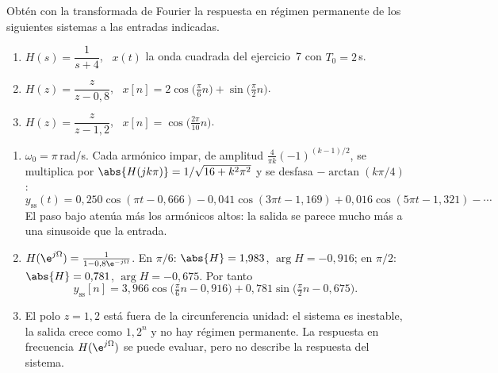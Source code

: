 \documentclass[11pt,a4paper]{scrartcl}
\begin{document}
\begin{ejercicio}
  Obtén con la transformada de Fourier la respuesta en régimen permanente de los siguientes sistemas a las entradas indicadas.
  \begin{enumerate}[label=\alph*)]
    \item $H(s)=\dfrac{1}{s+4}$, \ $x(t)$ la onda cuadrada del ejercicio~7 con $T_0=2$\,s.
    \item $H(z)=\dfrac{z}{z-0{,}8}$, \ $x[n]=2\cos\big(\tfrac\pi6n\big)+\sin\big(\tfrac\pi2n\big)$.
    \item $H(z)=\dfrac{z}{z-1{,}2}$, \ $x[n]=\cos\big(\tfrac{2\pi}{10}n\big)$.
  \end{enumerate}
\end{ejercicio}
\begin{solucion}
  \begin{enumerate}[label=\alph*)]
    \item $\omega_0=\pi$\,rad/s. Cada armónico impar, de amplitud $\frac{4}{\pi k}(-1)^{(k-1)/2}$, se multiplica por $\abs{H(jk\pi)}=1/\sqrt{16+k^2\pi^2}$ y se desfasa $-\arctan(k\pi/4)$:
    \[
      y_{\mathrm{ss}}(t)=0{,}250\cos(\pi t-0{,}666)-0{,}041\cos(3\pi t-1{,}169)+0{,}016\cos(5\pi t-1{,}321)-\cdots
    \]
    El paso bajo atenúa más los armónicos altos: la salida se parece mucho más a una sinusoide que la entrada.
    \item $H(\e^{j\Omega})=\frac{1}{1-0{,}8\e^{-j\Omega}}$. En $\pi/6$: $\abs{H}=1{,}983$, $\arg H=-0{,}916$; en $\pi/2$: $\abs{H}=0{,}781$, $\arg H=-0{,}675$. Por tanto
    \[
      y_{\mathrm{ss}}[n]=3{,}966\cos\big(\tfrac\pi6n-0{,}916\big)+0{,}781\sin\big(\tfrac\pi2n-0{,}675\big).
    \]
    \item El polo $z=1{,}2$ está fuera de la circunferencia unidad: el sistema es inestable, la salida crece como $1{,}2^n$ y no hay régimen permanente. La respuesta en frecuencia $H(\e^{j\Omega})$ se puede evaluar, pero no describe la respuesta del sistema.
  \end{enumerate}
\end{solucion}
\end{document}
